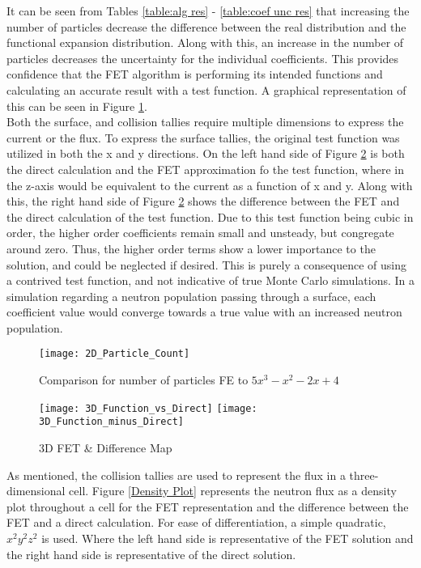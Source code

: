 \documentclass[10tma4paper]{article}
\begin{document}
It can be seen from Tables \ref{table:alg res} - \ref{table:coef unc res} that increasing the number of particles decrease the difference between the real distribution and the functional expansion distribution. Along with this, an increase in the number of particles decreases the uncertainty for the individual coefficients. This provides confidence that the FET algorithm is performing its intended functions and calculating an accurate result with a test function. A graphical representation of this can be seen in Figure \ref{2D Plot}. 
\\
Both the surface, and collision tallies require multiple dimensions to express the current or the flux. To express the surface tallies, the original test function was utilized in both the x and y directions. On the left hand side of Figure \ref{3D Plot} is both the direct calculation and the FET approximation fo the test function, where in the z-axis would be equivalent to the current as a function of x and y. Along with this, the right hand side of Figure \ref{3D Plot} shows the difference between the FET and the direct calculation of the test function. Due to this test function being cubic in order, the higher order coefficients remain small and unsteady, but congregate around zero. Thus, the higher order terms show a lower importance to the solution, and could be neglected if desired. This is purely a consequence of using a contrived test function, and not indicative of true Monte Carlo simulations. In a simulation regarding a neutron population passing through a surface, each coefficient value would converge towards a true value with an increased neutron population.
\\
\begin{figure}[!htbp]
	\caption{Comparison for number of particles FE to $5x^{3}-x^{2}-2x+4$}
	\begin{center}
	\texttt{[image: 2D\_Particle\_Count]}
	\label{2D Plot}
	\end{center}
\end{figure}
\begin{figure}[!htbp]
	\caption{3D FET \& Difference Map}
	\begin{center}
		\texttt{[image: 3D\_Function\_vs\_Direct]}
		\texttt{[image: 3D\_Function\_minus\_Direct]}
	\end{center}
	\label{3D Plot}
\end{figure}
As mentioned, the collision tallies are used to represent the flux in a three-dimensional cell. Figure \ref{Density Plot} represents the neutron flux as a density plot throughout a cell for the FET representation and the difference between the FET and a direct calculation. For ease of differentiation, a simple quadratic, $x^{2}y^{2}z^{2}$ is used. Where the left hand side is representative of the FET solution and the right hand side is representative of the direct solution.
\end{document}
